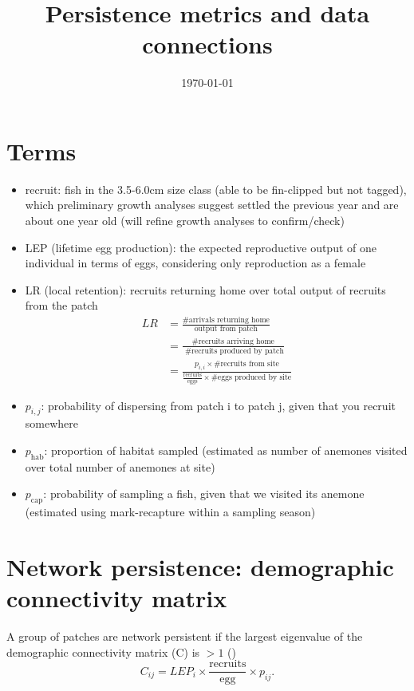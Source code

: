 \documentclass[12pt, oneside]{article}   	%
\title{Persistence metrics and data connections}
\begin{document}
\date{\today}
\maketitle{}
\section{Terms}
\begin{itemize}
	\item recruit: fish in the 3.5-6.0cm size class (able to be fin-clipped but not tagged), which preliminary growth analyses suggest settled the previous year and are about one year old (will refine growth analyses to confirm/check)
	\item LEP (lifetime egg production): the expected reproductive output of one individual in terms of eggs, considering only reproduction as a female
	\item LR (local retention): recruits returning home over total output of recruits from the patch
		\begin{equation}
			\begin{split}
				LR & = \frac{\text{\# arrivals returning home}}{\text{output from patch}} \\
				   & = \frac{\text{\# recruits arriving home}}{\text{ \# recruits produced by patch}} \\
				   & = \frac{p_{i,i} \times \text{\# recruits from site}}{\frac{\text{recruits}}{\text{eggs}} \times \text{\# eggs produced by site}}
			\end{split}
		\end{equation}
	\item $p_{i,j}$: probability of dispersing from patch i to patch j, given that you recruit somewhere
	\item $p_{\text{hab}}$: proportion of habitat sampled (estimated as number of anemones visited over total number of anemones at site)
	\item $p_{\text{cap}}$: probability of sampling a fish, given that we visited its anemone (estimated using mark-recapture within a sampling season)
\end{itemize}

\section{Network persistence: demographic connectivity matrix}
A group of patches are network persistent if the largest eigenvalue of the demographic connectivity matrix (C) is $ > 1$ (\cite{burgess2014beyond,lyselpopulation})
\begin{equation}
C_{ij} = LEP_i \times \frac{\text{recruits}}{\text{egg}} \times p_{ij}.
\end{equation}
\end{document}
